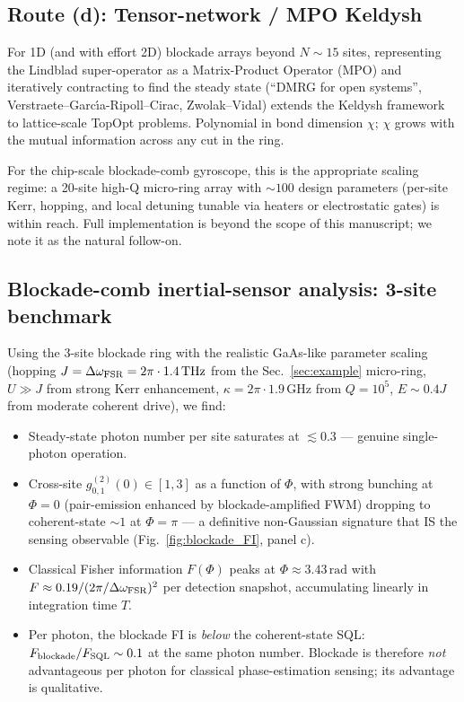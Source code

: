 \documentclass[11pt]{article}
\begin{document}
\subsection{Route (d): Tensor-network / MPO Keldysh}
\label{sec:route_d_MPO}

For 1D (and with effort 2D) blockade arrays beyond $N\sim 15$ sites,
representing the Lindblad super-operator as a Matrix-Product Operator
(MPO) and iteratively contracting to find the steady state (``DMRG
for open systems'', Verstraete--Garc\'\i a-Ripoll--Cirac, Zwolak--Vidal)
extends the Keldysh framework to lattice-scale TopOpt problems.
Polynomial in bond dimension $\chi$; $\chi$ grows with the mutual
information across any cut in the ring.

For the chip-scale blockade-comb gyroscope, this is the
appropriate scaling regime: a 20-site high-Q micro-ring array with
$\sim 100$ design parameters (per-site Kerr, hopping, and local
detuning tunable via heaters or electrostatic gates) is within reach.
Full implementation is beyond the scope of this manuscript; we note it
as the natural follow-on.

\subsection{Blockade-comb inertial-sensor analysis: 3-site benchmark}
\label{sec:blockade_results}

Using the 3-site blockade ring with the realistic GaAs-like
parameter scaling (hopping $J = \Delta\omega_{\rm FSR} = 2\pi\cdot
1.4\,\mathrm{THz}$ from the Sec.~\ref{sec:example} micro-ring,
$U\gg J$ from strong Kerr enhancement, $\kappa = 2\pi\cdot 1.9\,\mathrm{GHz}$
from $Q=10^5$, $E\sim 0.4 J$ from moderate coherent drive), we find:

\begin{itemize}\itemsep0em
\item Steady-state photon number per site saturates at
  $\lesssim 0.3$ --- genuine single-photon operation.
\item Cross-site $g^{(2)}_{0,1}(0) \in [1, 3]$ as a function of $\Phi$,
  with strong bunching at $\Phi=0$ (pair-emission enhanced by
  blockade-amplified FWM) dropping to coherent-state $\sim 1$ at
  $\Phi = \pi$ --- a definitive non-Gaussian signature that IS the
  sensing observable (Fig.~\ref{fig:blockade_FI}, panel c).
\item Classical Fisher information $F(\Phi)$ peaks at
  $\Phi \approx 3.43\,\mathrm{rad}$ with
  $F\approx 0.19/(2\pi/\Delta\omega_{\rm FSR})^2$ per detection
  snapshot, accumulating linearly in integration time $T$.
\item Per photon, the blockade FI is \emph{below} the coherent-state
  SQL: $F_{\rm blockade}/F_{\rm SQL} \sim 0.1$ at the same photon
  number.  Blockade is therefore \emph{not} advantageous per photon
  for classical phase-estimation sensing; its advantage is qualitative.
\end{itemize}
\end{document}
